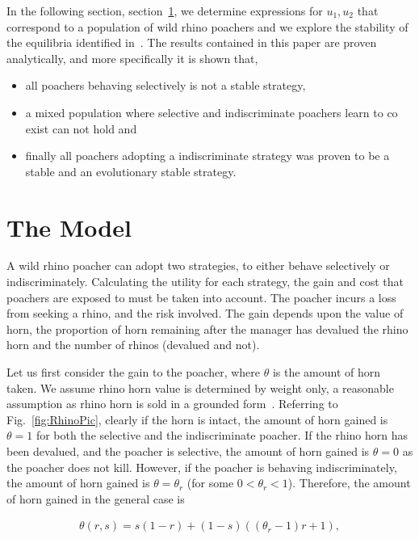 \documentclass[10pt]{article}
\begin{document}
In the following section, section~\ref{section:the_model}, we determine expressions
for \(u_1, u_2\) that correspond to a population of wild rhino poachers and we
explore the stability of the equilibria identified in~\cite{Lee}. The results
contained in this paper are proven analytically, and more specifically it is 
shown that,

\begin{itemize}
	\item all poachers behaving selectively is not a stable strategy,  
	\item a mixed population where selective and indiscriminate poachers
	learn to co exist can not hold and
	\item finally all poachers adopting a indiscriminate strategy was proven to
	be a stable and an evolutionary stable strategy.
\end{itemize}
\section{The Model}\label{section:the_model}

A wild rhino poacher can adopt two strategies, to either behave selectively
or indiscriminately. Calculating the utility for each strategy, the gain and cost
that poachers are exposed to must be taken into account. The poacher incurs a
loss from seeking a rhino, and the risk involved. The gain depends upon the value
of horn, the proportion of horn remaining after the manager has devalued the 
rhino horn and the number of rhinos (devalued and not).

Let us first consider the gain to the poacher, where \(\theta\) is the amount of 
horn taken. We assume rhino horn value is determined by weight only, a 
reasonable assumption as rhino horn is sold in a grounded form~\cite{Saverhino}.
Referring to Fig.~\ref{fig:RhinoPic}, clearly if the horn is intact, the amount of
horn gained is \(\theta=1\) for both the selective and the indiscriminate poacher.
If the rhino horn has been devalued, and the poacher is selective, the amount of horn 
gained is \(\theta=0\) as the poacher does not kill. However, if the poacher is 
behaving indiscriminately, the amount of horn gained is \(\theta = \theta_r\)
(for some \(0<\theta_r<1\)). 
Therefore, the amount of horn gained in the general case is

\begin{eqnarray}
	\label{eqn:theta}
	\theta(r, s) = s (1 - r) + (1 - s) ((\theta_r - 1) r + 1),
\end{eqnarray}
\end{document}
